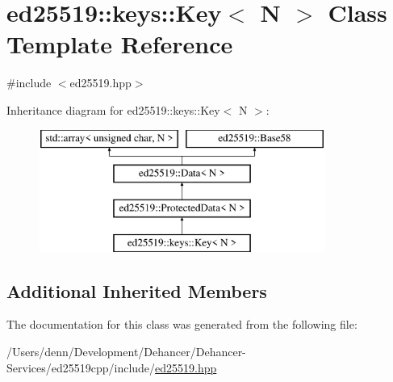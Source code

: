 \hypertarget{classed25519_1_1keys_1_1_key}{}\section{ed25519\+::keys\+::Key$<$ N $>$ Class Template Reference}
\label{classed25519_1_1keys_1_1_key}


{\ttfamily \#include $<$ed25519.\+hpp$>$}

Inheritance diagram for ed25519\+::keys\+::Key$<$ N $>$\+:\begin{figure}[H]
\begin{center}
\leavevmode
\includegraphics[height=4.000000cm]{classed25519_1_1keys_1_1_key}
\end{center}
\end{figure}
\subsection*{Additional Inherited Members}


The documentation for this class was generated from the following file\+:\begin{DoxyCompactItemize}
\item 
/\+Users/denn/\+Development/\+Dehancer/\+Dehancer-\/\+Services/ed25519cpp/include/\mbox{\hyperlink{ed25519_8hpp}{ed25519.\+hpp}}\end{DoxyCompactItemize}
